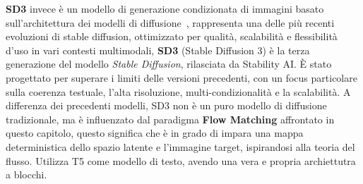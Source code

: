 \textbf{SD3} invece è un modello di generazione condizionata di immagini basato sull'architettura dei modelli di diffusione~\cite{stablediffusion3}, rappresenta una delle più recenti evoluzioni di stable diffusion, ottimizzato per qualità, scalabilità e flessibilità d'uso in vari contesti multimodali, \textbf{SD3} (Stable Diffusion 3) è la terza generazione del modello \textit{Stable Diffusion}, rilasciata da Stability AI. È stato progettato per superare i limiti delle versioni precedenti, con un focus particolare sulla coerenza testuale, l'alta risoluzione, multi-condizionalità e la scalabilità. A differenza dei precedenti modelli, SD3 non è un puro modello di diffusione tradizionale, ma è influenzato dal paradigma \textbf{Flow Matching} affrontato in questo capitolo, questo significa che è in grado di impara una mappa deterministica dello spazio latente e l'immagine target, ispirandosi alla teoria del flusso. Utilizza T5 come modello di testo, avendo una vera e propria archiettutra a blocchi.
\vspace{0.8cm}
